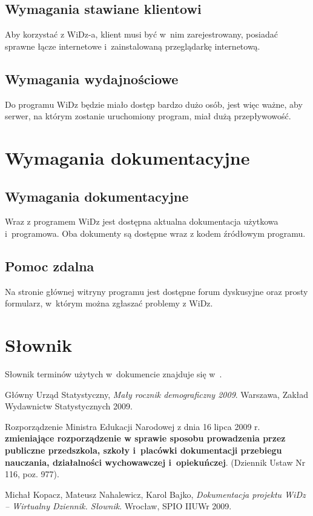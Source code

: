 \documentclass[12pt,leqno,twoside]{mwart}
\begin{document}
\subsection{Wymagania stawiane klientowi}
\noindent Aby korzystać z WiDz-a, klient musi być w~nim zarejestrowany, posiadać sprawne łącze internetowe i~zainstalowaną przeglądarkę internetową.

\subsection{Wymagania wydajnościowe}
\noindent Do programu WiDz będzie miało dostęp bardzo dużo osób, jest więc ważne, aby serwer, na którym zostanie uruchomiony program, miał dużą przepływowość.
 
\section{Wymagania dokumentacyjne}
\subsection{Wymagania dokumentacyjne}
\noindent Wraz z programem WiDz jest dostępna aktualna dokumentacja użytkowa i~programowa. Oba dokumenty są dostępne wraz z kodem źródłowym programu.
\subsection{Pomoc zdalna}
\noindent Na stronie głównej witryny programu jest dostępne forum dyskusyjne oraz prosty formularz, w~którym można zgłaszać problemy z WiDz.


\section{Słownik}
\noindent Słownik terminów użytych w~dokumencie znajduje się w~\cite{SLO}.

\begin{thebibliography}{99}
 Główny Urząd Statystyczny, {\it Mały rocznik demograficzny 2009}. Warszawa, Zakład Wydawnictw Statystycznych 2009.

 Rozporządzenie Ministra Edukacji Narodowej z dnia 16 lipca 2009 r. \textbf{zmieniające rozporządzenie w sprawie sposobu prowadzenia przez publiczne przedszkola, szkoły i~placówki dokumentacji przebiegu nauczania, działalności 	wychowawczej i~opiekuńczej}. (Dziennik Ustaw Nr 116, poz. 977).

 Michał Kopacz, Mateusz Nahalewicz, Karol Bajko, {\it Dokumentacja projektu WiDz -- Wirtualny Dziennik. Słownik}. Wrocław, SPIO IIUWr 2009.
\end{thebibliography}
\end{document}
